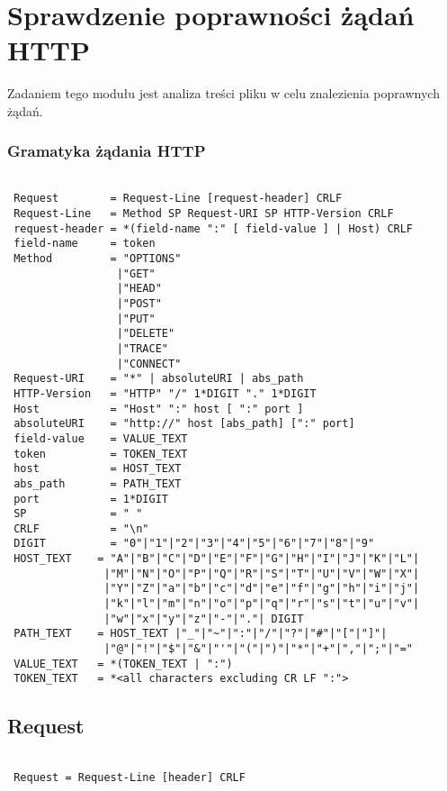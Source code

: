\documentclass[a4paper,11pt]{report}
\begin{document}
\section{Sprawdzenie poprawności żądań HTTP}

Zadaniem tego modułu jest analiza treści pliku w celu znalezienia poprawnych żądań.

\subsubsection{Gramatyka żądania HTTP}

\begin{lstlisting}

 Request        = Request-Line [request-header] CRLF
 Request-Line   = Method SP Request-URI SP HTTP-Version CRLF 
 request-header = *(field-name ":" [ field-value ] | Host) CRLF
 field-name     = token
 Method         = "OPTIONS" 
                 |"GET"
                 |"HEAD"
                 |"POST" 
                 |"PUT"
                 |"DELETE" 
                 |"TRACE" 
                 |"CONNECT"
 Request-URI    = "*" | absoluteURI | abs_path
 HTTP-Version   = "HTTP" "/" 1*DIGIT "." 1*DIGIT
 Host           = "Host" ":" host [ ":" port ] 
 absoluteURI    = "http://" host [abs_path] [":" port]
 field-value    = VALUE_TEXT
 token          = TOKEN_TEXT
 host           = HOST_TEXT
 abs_path       = PATH_TEXT
 port           = 1*DIGIT
 SP             = " "
 CRLF           = "\n"
 DIGIT          = "0"|"1"|"2"|"3"|"4"|"5"|"6"|"7"|"8"|"9"
 HOST_TEXT    = "A"|"B"|"C"|"D"|"E"|"F"|"G"|"H"|"I"|"J"|"K"|"L"|
               |"M"|"N"|"O"|"P"|"Q"|"R"|"S"|"T"|"U"|"V"|"W"|"X"|
               |"Y"|"Z"|"a"|"b"|"c"|"d"|"e"|"f"|"g"|"h"|"i"|"j"|
               |"k"|"l"|"m"|"n"|"o"|"p"|"q"|"r"|"s"|"t"|"u"|"v"|
               |"w"|"x"|"y"|"z"|"-"|"."| DIGIT
 PATH_TEXT    = HOST_TEXT |"_"|"~"|":"|"/"|"?"|"#"|"["|"]"|
               |"@"|"!"|"$"|"&"|"'"|"("|")"|"*"|"+"|","|";"|"="
 VALUE_TEXT   = *(TOKEN_TEXT | ":")
 TOKEN_TEXT   = *<all characters excluding CR LF ":">

\end{lstlisting}

\subsection{Request}

\begin{lstlisting}

 Request = Request-Line [header] CRLF
 
\end{lstlisting}
\end{document}
